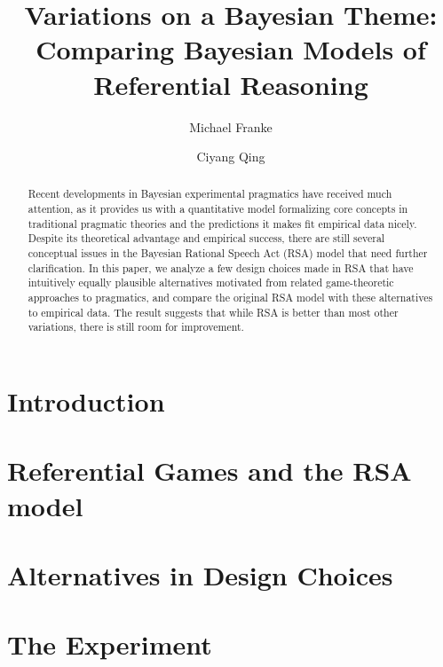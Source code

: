 \documentclass{llncs}
\title{Variations on a Bayesian Theme: Comparing Bayesian Models of Referential Reasoning}
\author{Michael Franke \and Ciyang Qing}
\institute{Institute for Logic, Language and Computation}
\begin{document}
\maketitle

\begin{abstract}
Recent developments in Bayesian experimental pragmatics have received much attention, as it provides us with a quantitative model formalizing core concepts in traditional pragmatic theories and the predictions it makes fit empirical data nicely. Despite its theoretical advantage and empirical success, there are still several conceptual issues in the Bayesian Rational Speech Act (RSA) model that need further clarification. In this paper, we analyze a few design choices made in RSA that have intuitively equally plausible alternatives motivated from related game-theoretic approaches to pragmatics, and compare the original RSA model with these alternatives to empirical data. The result suggests that while RSA is better than most other variations, there is still room for improvement.
\end{abstract}

\section{Introduction}




\section{Referential Games and the RSA model}




\section{Alternatives in Design Choices}




\section{The Experiment}
\end{document}
